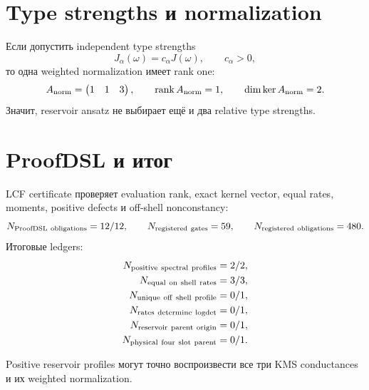 \section{Type strengths и normalization}

Если допустить independent type strengths
\begin{equation}
 J_\alpha(\omega)=c_\alpha J(\omega),
 \qquad c_\alpha>0,
 \label{eq:v9-kms-reservoir-type-strengths}
\end{equation}
то одна weighted normalization имеет rank one:
\begin{equation}
 A_{\rm norm}=\begin{pmatrix}1&1&3\end{pmatrix},
 \qquad \operatorname{rank} A_{\rm norm}=1,
 \qquad \dim\ker A_{\rm norm}=2.
 \label{eq:v9-kms-reservoir-normalization-rank}
\end{equation}
Значит, reservoir ansatz не выбирает ещё и два relative type strengths.

\section{ProofDSL и итог}

LCF certificate проверяет evaluation rank, exact kernel vector, equal
rates, moments, positive defects и off-shell nonconstancy:
\begin{equation}
 N_{\rm ProofDSL\ obligations}=12/12,
 \qquad N_{\rm registered\ gates}=59,
 \qquad N_{\rm registered\ obligations}=480.
 \label{eq:v9-kms-reservoir-proofdsl}
\end{equation}
Итоговые ledgers:
\begin{equation}
 \begin{aligned}
 N_{\rm positive\ spectral\ profiles}&=2/2,\\
 N_{\rm equal\ on\ shell\ rates}&=3/3,\\
 N_{\rm unique\ off\ shell\ profile}&=0/1,\\
 N_{\rm rates\ determine\ logdet}&=0/1,\\
 N_{\rm reservoir\ parent\ origin}&=0/1,\\
 N_{\rm physical\ four\ slot\ parent}&=0/1.
 \end{aligned}
 \label{eq:v9-kms-reservoir-ledger}
\end{equation}

\begin{theorem}
Positive reservoir profiles могут точно воспроизвести все три KMS
conductances и их weighted normalization.
\end{theorem}

